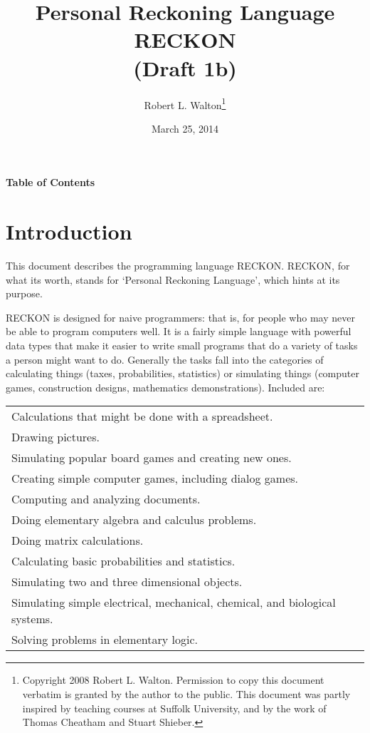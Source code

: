 \documentclass[12pt]{article}
\makeatletter
\renewcommand\tableofcontents{%
    \begin{list}{}%
	     {\setlength{\itemsep}{0in}%
	      \setlength{\topsep}{0in}%
	      \setlength{\parsep}{1ex}%
	      \setlength{\labelwidth}{0in}%
	      \setlength{\baselineskip}{1.5ex}%
	      \setlength{\leftmargin}{0.8in}%
	      \setlength{\rightmargin}{0.8in}}%
    \item\@starttoc{toc}%
    \end{list}}
\makeatother
\begin{document}
        
\title{Personal Reckoning Language\\[2ex]
       RECKON\\[2ex]
       (Draft 1b)}

\author{Robert L. Walton\thanks{Copyright 2008 Robert L. Walton.
Permission to copy this document verbatim is granted by the author
to the public.  This document was partly inspired
by teaching courses at Suffolk University, and by the work of Thomas
Cheatham and Stuart Shieber.}}

\date{March 25, 2014}

\maketitle

\newpage
\begin{center}
\large \bf Table of Contents
\end{center}

\bigskip

\tableofcontents 

\newpage

\section{Introduction}

This document describes the programming language RECKON.  RECKON,
for what its worth, stands for `Personal Reckoning Language',
which hints at its purpose.

RECKON is designed for naive programmers: that is, for people who may never
be able to program computers well.  It is a fairly simple language with
powerful data types that make it easier to write small programs
that do a variety of tasks a person might want to do.  Generally
the tasks fall into the categories of calculating things (taxes,
probabilities, statistics) or simulating things
(computer games, construction designs, mathematics demonstrations).
Included are:

\begin{center}
\begin{tabular}{l}
Calculations that might be done with a spreadsheet. \\
Drawing pictures. \\
Simulating popular board games and creating new ones. \\
Creating simple computer games, including dialog games. \\
Computing and analyzing documents. \\
Doing elementary algebra and calculus problems. \\
Doing matrix calculations. \\ 
Calculating basic probabilities and statistics. \\
Simulating two and three dimensional objects. \\
Simulating simple electrical, mechanical, chemical, and biological systems.\\
Solving problems in elementary logic. \\
\end{tabular}
\end{center}
\end{document}

